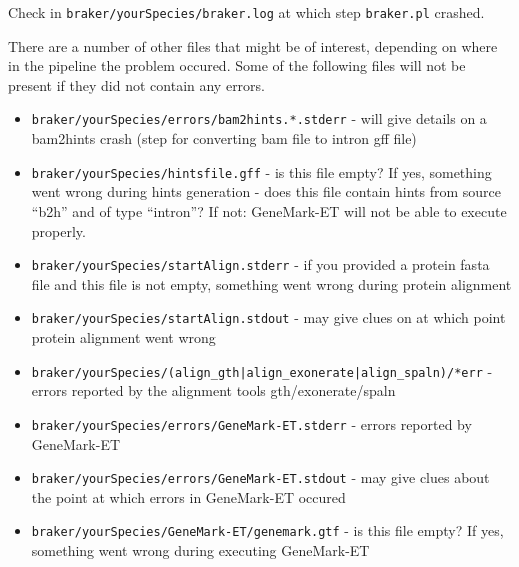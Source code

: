 \documentclass[a4paper,10pt]{report}
\begin{document}
Check in \texttt{braker/yourSpecies/braker.log} at which step \texttt{braker.pl} crashed.

There are a number of other files that might be of interest, depending on where in the pipeline the
problem occured. Some of the following files will not be present if they did not contain any errors.

\begin{itemize}
 \item  \texttt{braker/yourSpecies/errors/bam2hints.*.stderr} - will give details on a bam2hints crash (step for 
                                                  converting bam file to intron gff file)
 
 \item  \texttt{braker/yourSpecies/hintsfile.gff} - is this file empty? If yes, something went wrong during hints 
                                      generation
                                    - does this file contain hints from source ``b2h'' and of type 
                                      ``intron''? If not: GeneMark-ET will not be able to execute 
                                      properly.
 
 \item  \texttt{braker/yourSpecies/startAlign.stderr} - if you provided a protein fasta file and this file is not
                                          empty, something went wrong during protein alignment
\item    \texttt{braker/yourSpecies/startAlign.stdout} - may give clues on at which point protein alignment went
                                          wrong

 \item  \texttt{braker/yourSpecies/(align\_gth|align\_exonerate|align\_spaln)/*err} - errors reported by the 
																																		 alignment tools 
                                                                     gth/exonerate/spaln

 \item  \texttt{braker/yourSpecies/errors/GeneMark-ET.stderr} - errors reported by GeneMark-ET
 \item  \texttt{braker/yourSpecies/errors/GeneMark-ET.stdout} - may give clues about the point at which errors in
                                                  GeneMark-ET occured

 \item  \texttt{braker/yourSpecies/GeneMark-ET/genemark.gtf} - is this file empty? If yes, something went wrong 
                                                 during executing GeneMark-ET


\end{itemize}
\end{document}
